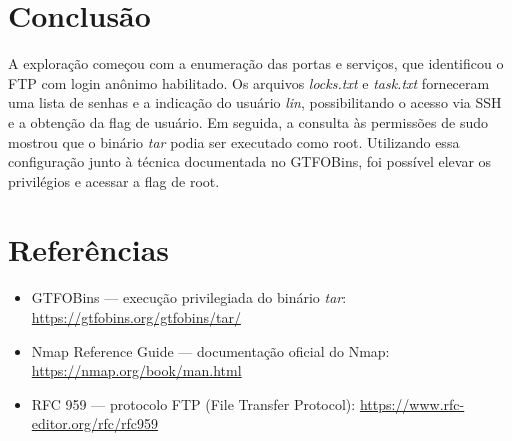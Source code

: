 \documentclass[12pt]{article} %
\begin{document}
\section{Conclusão}

A exploração começou com a enumeração das portas e serviços, que identificou o FTP com login anônimo habilitado. Os arquivos \textit{locks.txt} e \textit{task.txt} forneceram uma lista de senhas e a indicação do usuário \textit{lin}, possibilitando o acesso via SSH e a obtenção da flag de usuário. Em seguida, a consulta às permissões de sudo mostrou que o binário \textit{tar} podia ser executado como root. Utilizando essa configuração junto à técnica documentada no GTFOBins, foi possível elevar os privilégios e acessar a flag de root.

\section{Referências}

\begin{itemize}
    \item GTFOBins --- execução privilegiada do binário \textit{tar}: \url{https://gtfobins.org/gtfobins/tar/}
    \item Nmap Reference Guide --- documentação oficial do Nmap: \url{https://nmap.org/book/man.html}
    \item RFC 959 --- protocolo FTP (File Transfer Protocol): \url{https://www.rfc-editor.org/rfc/rfc959}
\end{itemize}
\end{document}
